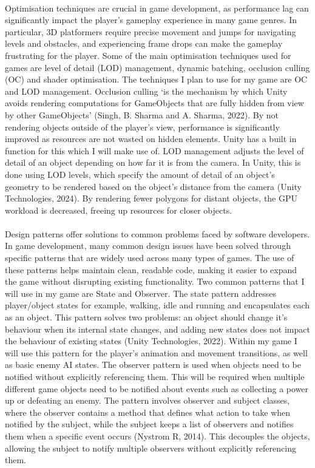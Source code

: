 \documentclass[12pt]{article}
\begin{document}
\paragraph{}
Optimisation techniques are crucial in game development, as performance lag can significantly impact the player's gameplay experience in many game genres. In particular, 3D platformers require precise movement and jumps for navigating levels and obstacles, and experiencing frame drops can make the gameplay frustrating for the player. Some of the main optimisation techniques used for games are level of detail (LOD) management, dynamic batching, occlusion culling (OC) and shader optimisation. The techniques I plan to use for my game are OC and LOD management. Occlusion culling ‘is the mechanism by which Unity avoids rendering computations for GameObjects that are fully hidden from view by other GameObjects’ (Singh, B. Sharma and A. Sharma, 2022). By not rendering objects outside of the player's view, performance is significantly improved as resources are not wasted on hidden elements. Unity has a built in function for this which I will make use of. LOD management adjusts the level of detail of an object depending on how far it is from the camera. In Unity, this is done using LOD levels, which specify the amount of detail of an object’s geometry to be rendered based on the object’s distance from the camera (Unity Technologies, 2024). By rendering fewer polygons for distant objects, the GPU workload is decreased, freeing up resources for closer objects.
\paragraph{}
Design patterns offer solutions to common problems faced by software developers. In game development, many common design issues have been solved through specific patterns that are widely used across many types of games. The use of these patterns helps maintain clean, readable code, making it easier to expand the game without disrupting existing functionality. Two common patterns that I will use in my game are State and Observer. The state pattern addresses player/object states for example, walking, idle and running and encapsulates each as an object. This pattern solves two problems: an object should change it’s behaviour when its internal state changes, and adding new states does not impact the behaviour of existing states (Unity Technologies, 2022). Within my game I will use this pattern for the player’s animation and movement transitions, as well as basic enemy AI states. The observer pattern is used when objects need to be notified without explicitly referencing them. This will be required when multiple different game objects need to be notified about events such as collecting a power up or defeating an enemy. The pattern involves observer and subject classes, where the observer contains a method that defines what action to take when notified by the subject, while the subject keeps a list of observers and notifies them when a specific event occurs (Nystrom R, 2014). This decouples the objects, allowing the subject to notify multiple observers without explicitly referencing them. 
\end{document}

